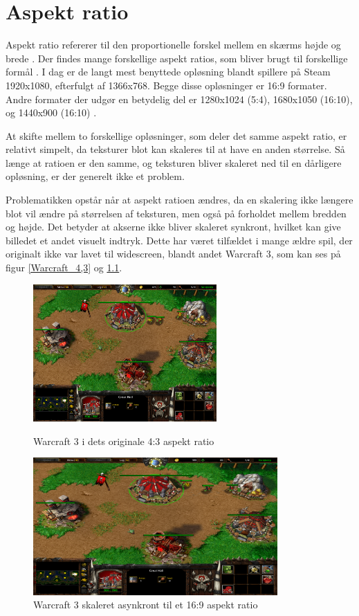 \documentclass[Main.tex]{AspectRatio.tex}
\begin{document}
\chapter{Aspekt ratio}

Aspekt ratio refererer til den proportionelle forskel mellem en skærms højde og brede \cite{Gibson}. Der findes mange forskellige aspekt ratios, som bliver brugt til forskellige formål \cite{CommonResolutions}. I dag er de langt mest benyttede opløsning blandt spillere på Steam 1920x1080, efterfulgt af 1366x768. Begge disse opløsninger er 16:9 formater. Andre formater der udgør en betydelig del er 1280x1024 (5:4), 1680x1050 (16:10), og 1440x900 (16:10) \cite{Steam}.

At skifte mellem to forskellige opløsninger, som deler det samme aspekt ratio, er relativt simpelt, da teksturer blot kan skaleres til at have en anden størrelse. Så længe at ratioen er den samme, og teksturen bliver skaleret ned til en dårligere opløsning, er der generelt ikke et problem. 

Problematikken opstår når at aspekt ratioen ændres, da en skalering ikke længere blot vil ændre på størrelsen af teksturen, men også på forholdet mellem bredden og højde. Det betyder at akserne ikke bliver skaleret synkront, hvilket kan give billedet et andet visuelt indtryk. Dette har været tilfældet i mange ældre spil, der originalt ikke var lavet til widescreen, blandt andet Warcraft 3, som kan ses på figur \ref{Warcraft_4,3} og \ref{Warcraft_16,9}. \cite{Wills}

\begin{figure}[h]
\centering
\parbox{7cm}{   
\includegraphics[width = 7cm]{billeder/Warcraft_4,3}
\caption{Warcraft 3 i dets originale 4:3 aspekt ratio}    
\label{Warcraft_4,3}}
\qquad
\begin{minipage}{9.33cm}
\includegraphics[width = 9.33cm]{billeder/Warcraft_16,9}
\caption{Warcraft 3 skaleret asynkront til et 16:9 aspekt ratio}    
\label{Warcraft_16,9}
\end{minipage}
\end{figure}
\end{document}

